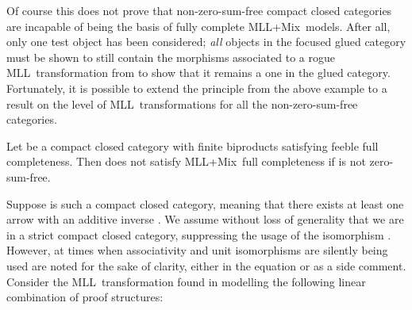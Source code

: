 \documentclass{LMCS}
\theoremstyle{plain}\newtheorem*{cLm}{Claim}
\newcommand{\mll}{MLL} \newcommand{\mall}{MALL}
\newcommand{\mllmix}{MLL+Mix} \newcommand{\GRel}{\mathbf{GRel}}
\newcommand{\p}{} \newcommand{\N}{\mathbb{N}}
\begin{document}
    \p Of course this does not prove that non-zero-sum-free compact closed categories are incapable of being the basis of fully complete \mllmix\ models. After all, only one test object has been considered; \emph{all} objects in the focused glued category must be shown to still contain the morphisms associated to a rogue \mll~transformation from  to show that it remains a one in the glued category. Fortunately, it is possible to extend the principle from the above example to a result on the level of \mll~transformations for all the non-zero-sum-free categories.
    
    \begin{prop} \label{NoMLLMixFCforBadGiCLemma}
    Let  be a compact closed category with finite biproducts satisfying feeble full completeness. Then  does not satisfy \mllmix~full completeness if  is not zero-sum-free.
    \end{prop}
    \proof
    Suppose  is such a compact closed category, meaning that there exists at least one arrow  with an additive inverse . We assume without loss of generality that we are in a strict compact closed category, suppressing the usage of the isomorphism . However, at times when associativity and unit isomorphisms are silently being used are noted for the sake of clarity, either in the equation or as a side comment. Consider the \mll~transformation  found in  modelling the following linear combination of proof structures:
    
\end{document}
